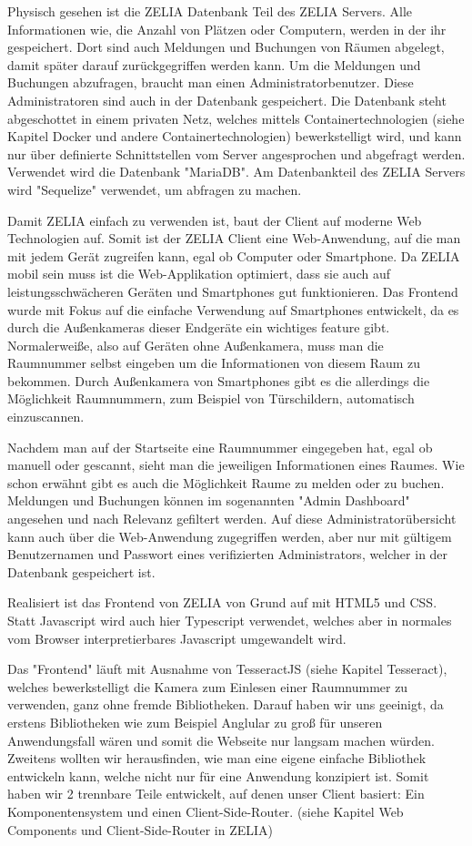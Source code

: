 Physisch gesehen ist die ZELIA Datenbank Teil des ZELIA Servers. Alle Informationen wie, die Anzahl von Plätzen oder Computern, werden in der ihr gespeichert. Dort sind auch Meldungen und Buchungen von Räumen abgelegt, damit später darauf zurückgegriffen werden kann. Um die Meldungen und Buchungen abzufragen, braucht man einen Administratorbenutzer. Diese Administratoren sind auch in der Datenbank gespeichert. Die Datenbank steht abgeschottet in einem privaten Netz, welches mittels Containertechnologien (siehe Kapitel Docker und andere Containertechnologien) bewerkstelligt wird, und kann nur über definierte Schnittstellen vom Server angesprochen und abgefragt werden. Verwendet wird die Datenbank "MariaDB". Am Datenbankteil des ZELIA Servers wird "Sequelize" verwendet, um abfragen zu machen.


Damit ZELIA einfach zu verwenden ist, baut der Client auf moderne Web Technologien auf. Somit ist der ZELIA Client eine Web-Anwendung, auf die man mit jedem Gerät zugreifen kann, egal ob Computer oder Smartphone. Da ZELIA mobil sein muss ist die Web-Applikation optimiert, dass sie auch auf leistungsschwächeren Geräten und Smartphones gut funktionieren. Das Frontend wurde mit Fokus auf die einfache Verwendung auf Smartphones entwickelt, da es durch die Außenkameras dieser Endgeräte ein wichtiges feature gibt. Normalerweiße, also auf Geräten ohne Außenkamera, muss man die Raumnummer selbst eingeben um die Informationen von diesem Raum zu bekommen. Durch Außenkamera von Smartphones gibt es die allerdings die Möglichkeit Raumnummern, zum Beispiel von Türschildern, automatisch einzuscannen. 

Nachdem man auf der Startseite eine Raumnummer eingegeben hat, egal ob manuell oder gescannt, sieht man die jeweiligen Informationen eines Raumes. Wie schon erwähnt gibt es auch die Möglichkeit Raume zu melden oder zu buchen. Meldungen und Buchungen können im sogenannten "Admin Dashboard" angesehen und nach Relevanz gefiltert werden. Auf diese Administratorübersicht kann auch über die Web-Anwendung zugegriffen werden, aber nur mit gültigem Benutzernamen und Passwort eines verifizierten Administrators, welcher in der Datenbank gespeichert ist.

Realisiert ist das Frontend von ZELIA von Grund auf mit HTML5 und CSS. Statt Javascript wird auch hier Typescript verwendet, welches aber in normales vom Browser interpretierbares Javascript umgewandelt wird. 

Das "Frontend" läuft mit Ausnahme von TesseractJS (siehe Kapitel Tesseract), welches bewerkstelligt die Kamera zum Einlesen einer Raumnummer zu verwenden, ganz ohne fremde Bibliotheken. Darauf haben wir uns geeinigt, da erstens Bibliotheken wie zum Beispiel Anglular zu groß für unseren Anwendungsfall wären und somit die Webseite nur langsam machen würden. Zweitens wollten wir herausfinden, wie man eine eigene einfache Bibliothek entwickeln kann, welche nicht nur für eine Anwendung konzipiert ist. Somit haben wir 2 trennbare Teile entwickelt, auf denen unser Client basiert: Ein Komponentensystem und einen Client-Side-Router. (siehe Kapitel Web Components und Client-Side-Router in ZELIA)